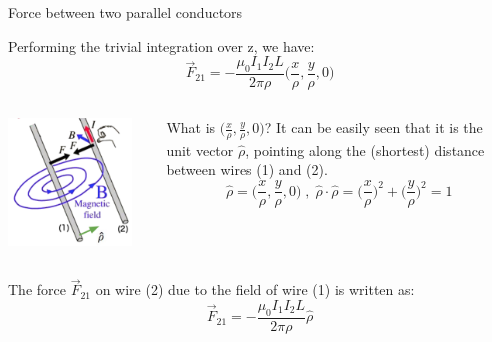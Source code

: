 %
%
%


\begin{frame}{Force between two parallel conductors}

Performing the trivial integration over z, we have:
\begin{equation*}
  \vec{F}_{21} = - \frac{\mu_0 I_{1} I_{2} L}{2\pi \rho} \Big(\frac{x}{\rho}, \frac{y}{\rho}, 0 \Big)
\end{equation*}

\vspace{0.2cm}

\begin{columns}
  \begin{column}{0.16\textwidth}
   \begin{center}
    \includegraphics[width=0.90\textwidth]{./images/schematics/magnetic_force_between_wires_rho_hat.png}\\
   \end{center}
  \end{column}
  \begin{column}{0.84\textwidth}
   {\small
     What is $\Big(\frac{x}{\rho}, \frac{y}{\rho}, 0 \Big)$?
    It can be easily seen that it is the unit vector $\hat{\rho}$, pointing along the (shortest) distance between wires (1) and (2).
    \begin{equation*}
      \hat{\rho} = \Big(\frac{x}{\rho}, \frac{y}{\rho}, 0 \Big) \; , \;
      \hat{\rho} \cdot \hat{\rho} = \Big( \frac{x}{\rho} \Big)^2 +  \Big( \frac{y}{\rho} \Big)^2 = 1
    \end{equation*}
   }
  \end{column}
\end{columns}

\vspace{0.2cm}

The force $\vec{F}_{21}$ on wire (2) due to the field of wire (1) is written as:
\begin{equation*}
  \vec{F}_{21} = - \frac{\mu_0 I_{1} I_{2} L}{2\pi \rho} \hat{\rho}
\end{equation*}

\end{frame}

